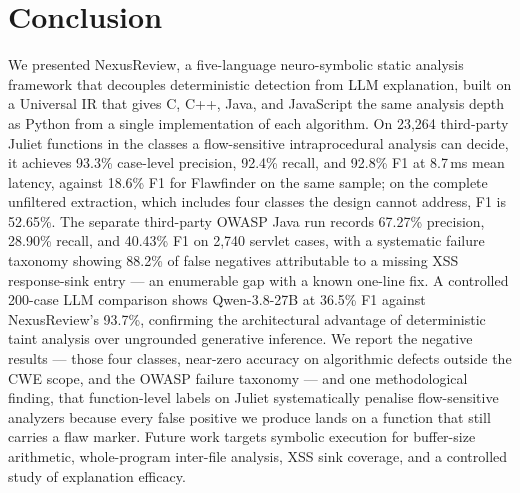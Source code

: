 \documentclass[10pt,conference]{IEEEtran}
\begin{document}
\section{Conclusion}
\label{sec:conclusion}
We presented NexusReview, a five-language neuro-symbolic static analysis
framework that decouples deterministic detection from LLM explanation, built
on a Universal IR that gives C, C++, Java, and JavaScript the same analysis
depth as Python from a single implementation of each algorithm. On 23{,}264
third-party Juliet functions in the classes a flow-sensitive
intraprocedural analysis can decide, it achieves 93.3\% case-level precision,
92.4\% recall, and 92.8\% F1 at 8.7\,ms mean latency, against 18.6\% F1 for
Flawfinder on the same sample; on the complete unfiltered extraction, which
includes four classes the design cannot address, F1 is 52.65\%. The separate
third-party OWASP Java run records 67.27\% precision, 28.90\% recall, and
40.43\% F1 on 2{,}740 servlet cases, with a systematic
failure taxonomy showing 88.2\% of false negatives attributable to a missing
XSS response-sink entry --- an enumerable gap with a known one-line fix.
A controlled 200-case LLM comparison shows Qwen-3.8-27B at 36.5\% F1
against NexusReview's 93.7\%, confirming the architectural advantage of
deterministic taint analysis over ungrounded generative inference.
We report the
negative results --- those four classes, near-zero accuracy on algorithmic
defects outside the CWE scope, and the OWASP failure taxonomy --- and one
methodological finding, that function-level labels on Juliet systematically
penalise flow-sensitive analyzers because every false positive we produce
lands on a function that still carries a flaw marker. Future work targets
symbolic execution for buffer-size arithmetic, whole-program inter-file
analysis, XSS sink coverage, and a controlled study of explanation efficacy.

\end{document}
